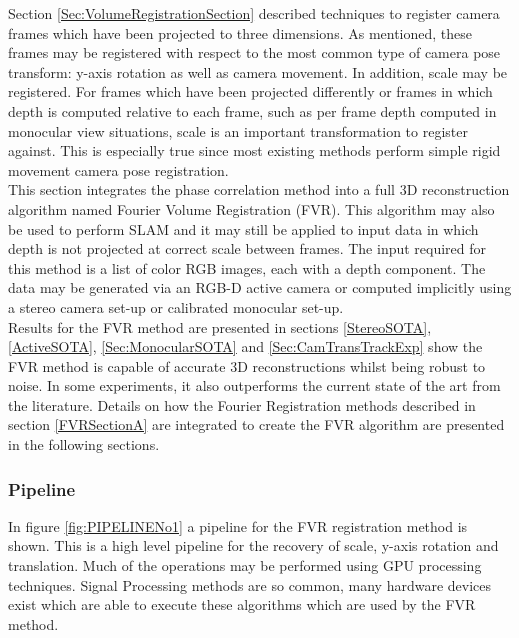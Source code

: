 
Section \ref{Sec:VolumeRegistrationSection} described techniques to register camera frames which have been projected to three dimensions. As mentioned, these frames may be registered with respect to the most common type of camera pose transform: y-axis rotation as well as camera movement. In addition, scale may be registered. For frames which have been projected differently or frames in which depth is computed relative to each frame, such as per frame depth computed in monocular view situations, scale is an important transformation to register against. This is especially true since most existing methods perform simple rigid movement camera pose registration. \\

This section integrates the phase correlation method into a full 3D reconstruction algorithm named Fourier Volume Registration (FVR). This algorithm may also be used to perform SLAM and it may still be applied to input data in which depth is not projected at correct scale between frames. The input required for this method is a list of color RGB images, each with a depth component. The data may be generated via an RGB-D active camera or computed implicitly using a stereo camera set-up or calibrated monocular set-up. \\

Results for the FVR method are presented in sections \ref{StereoSOTA}, \ref{ActiveSOTA}, \ref{Sec:MonocularSOTA} and \ref{Sec:CamTransTrackExp} show the FVR method is capable of accurate 3D reconstructions whilst being robust to noise. In some experiments, it also outperforms the current state of the art from the literature. Details on how the Fourier Registration methods described in section \ref{FVRSectionA} are integrated to create the FVR algorithm are presented in the following sections. \\


\subsubsection{Pipeline}

\label{sec:FVRPipelineSect}

In figure \ref{fig:PIPELINENo1} a pipeline for the FVR registration method is shown. This is a high level pipeline for the recovery of scale, y-axis rotation and translation. Much of the operations may be performed using GPU processing techniques. Signal Processing methods are so common, many hardware devices exist which are able to execute these algorithms which are used by the FVR method. \\

